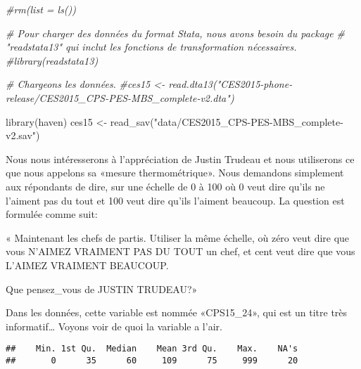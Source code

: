 \documentclass[
]{book}
\newenvironment{Shaded}{\begin{snugshade}}{\end{snugshade}}
\newcommand{\CommentTok}[1]{\textcolor[rgb]{0.56,0.35,0.01}{\textit{#1}}}
\newcommand{\FunctionTok}[1]{\textcolor[rgb]{0.00,0.00,0.00}{#1}}
\newcommand{\NormalTok}[1]{#1}
\newcommand{\OtherTok}[1]{\textcolor[rgb]{0.56,0.35,0.01}{#1}}
\newcommand{\SpecialCharTok}[1]{\textcolor[rgb]{0.00,0.00,0.00}{#1}}
\newcommand{\StringTok}[1]{\textcolor[rgb]{0.31,0.60,0.02}{#1}}
\begin{document}
\begin{Shaded}
\begin{Highlighting}[]
\CommentTok{\#rm(list = ls())}

\CommentTok{\# Pour charger des données du format Stata, nous avons besoin du package }
\CommentTok{\# "readstata13" qui inclut les fonctions de transformation nécessaires. }
\CommentTok{\#library(readstata13)}

\CommentTok{\# Chargeons les données.}
\CommentTok{\#ces15 \textless{}{-} read.dta13("CES2015{-}phone{-}release/CES2015\_CPS{-}PES{-}MBS\_complete{-}v2.dta")}

\FunctionTok{library}\NormalTok{(haven)}
\NormalTok{ces15 }\OtherTok{\textless{}{-}} \FunctionTok{read\_sav}\NormalTok{(}\StringTok{"data/CES2015\_CPS{-}PES{-}MBS\_complete{-}v2.sav"}\NormalTok{)}
\end{Highlighting}
\end{Shaded}

Nous nous intéresserons à l'appréciation de Justin Trudeau et nous utiliserons ce que nous appelons sa «mesure thermométrique». Nous demandons simplement aux répondants de dire, sur une échelle de 0 à 100 où 0 veut dire qu'ils ne l'aiment pas du tout et 100 veut dire qu'ils l'aiment beaucoup. La question est formulée comme suit:

« Maintenant les chefs de partis. Utiliser la même échelle, où zéro veut dire que vous N'AIMEZ VRAIMENT PAS DU TOUT un chef, et cent veut dire que vous L'AIMEZ VRAIMENT BEAUCOUP.

Que pensez\_vous de JUSTIN TRUDEAU?»

Dans les données, cette variable est nommée «CPS15\_24», qui est un titre très informatif\ldots{} Voyons voir de quoi la variable a l'air.

\begin{Shaded}
\end{Shaded}

\begin{verbatim}
##    Min. 1st Qu.  Median    Mean 3rd Qu.    Max.    NA's 
##       0      35      60     109      75     999      20
\end{verbatim}

\begin{Shaded}
\end{Shaded}
\end{document}
